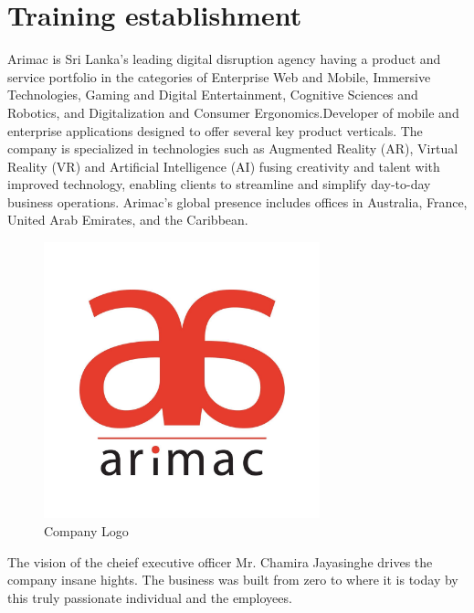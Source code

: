 \documentclass[twoside,12pt,times,onecolumn,a4paper]{report}
\begin{document}
\listoffigures
\listoftables


\chapter{Training establishment}

\hspace{3em} Arimac is Sri Lanka’s leading digital disruption agency having a product and service portfolio in the categories of Enterprise Web and Mobile, Immersive Technologies, Gaming and Digital Entertainment, Cognitive Sciences and Robotics, and Digitalization and Consumer Ergonomics.Developer of mobile and enterprise applications designed to offer several key product verticals. The company is specialized in technologies such as Augmented Reality (AR), Virtual Reality (VR) and Artificial Intelligence (AI) fusing creativity and talent with improved technology, enabling clients to streamline and simplify day-to-day business operations. Arimac’s global presence includes offices in Australia, France, United Arab Emirates, and the Caribbean.

\begin{figure}[!h]
  \centering
   \includegraphics[width=8cm]{logo}
  \caption{Company Logo}
\end{figure}

The vision of the cheief executive officer Mr. Chamira Jayasinghe drives the company insane hights. The business was built from zero to where it is today by this truly passionate individual and the employees. 
\end{document}
